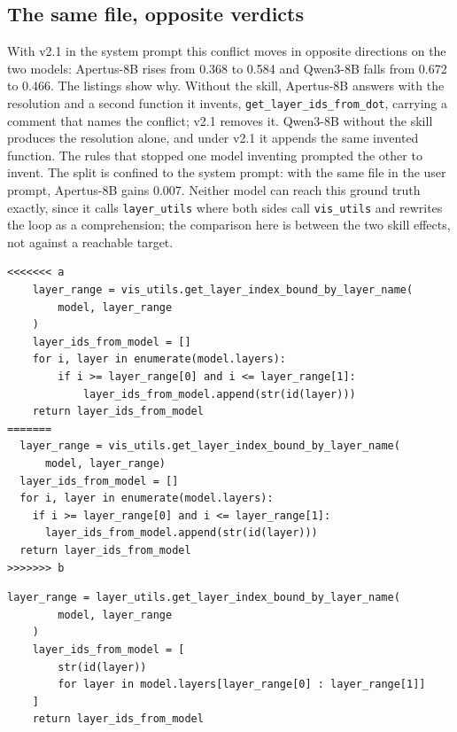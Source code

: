 \subsection{The same file, opposite verdicts}

With v2.1 in the system prompt this conflict moves in opposite directions on the
two models: Apertus-8B rises from 0.368 to 0.584 and Qwen3-8B falls from 0.672 to
0.466. The listings show why. Without the skill, Apertus-8B answers with the
resolution and a second function it invents, \texttt{get\_layer\_ids\_from\_dot},
carrying a comment that names the conflict; v2.1 removes it. Qwen3-8B without the
skill produces the resolution alone, and under v2.1 it appends the same invented
function. The rules that stopped one model inventing prompted the other to invent.
The split is confined to the system prompt: with the same file in the user prompt,
Apertus-8B gains 0.007. Neither model can reach this ground truth exactly, since it
calls \texttt{layer\_utils} where both sides call \texttt{vis\_utils} and rewrites
the loop as a comprehension; the comparison here is between the two skill effects,
not against a reachable target.

%

\begin{lstlisting}[style=conflictcode,title={\textbf{The conflict} (\texttt{0x8e6579cb86af64a8})}]
<<<<<<< a
    layer_range = vis_utils.get_layer_index_bound_by_layer_name(
        model, layer_range
    )
    layer_ids_from_model = []
    for i, layer in enumerate(model.layers):
        if i >= layer_range[0] and i <= layer_range[1]:
            layer_ids_from_model.append(str(id(layer)))
    return layer_ids_from_model
=======
  layer_range = vis_utils.get_layer_index_bound_by_layer_name(
      model, layer_range)
  layer_ids_from_model = []
  for i, layer in enumerate(model.layers):
    if i >= layer_range[0] and i <= layer_range[1]:
      layer_ids_from_model.append(str(id(layer)))
  return layer_ids_from_model
>>>>>>> b
\end{lstlisting}

\begin{lstlisting}[style=conflictcode,title={\textbf{Ground-truth resolution} (8 lines, 256 characters)}]
    layer_range = layer_utils.get_layer_index_bound_by_layer_name(
        model, layer_range
    )
    layer_ids_from_model = [
        str(id(layer))
        for layer in model.layers[layer_range[0] : layer_range[1]]
    ]
    return layer_ids_from_model
\end{lstlisting}

